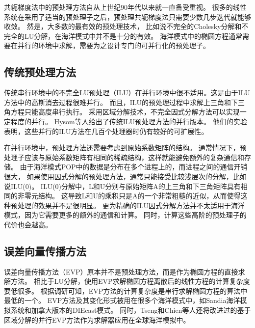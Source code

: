 共轭梯度法中的预处理方法自从上世纪90年代以来就一直备受重视。 
很多的线性系统在采用了适当的预处理子之后，预处理共轭梯度法只需要少数几步迭代就能够收敛。 
然是，大多数的最有效的预处理技术， 比如说不完全的Cholesky分解和不完全的LU分解，在海洋模式中并不是十分的有效。 
海洋模式中的椭圆方程通常需要在并行的环境中求解，需要为之设计专门的可并行化的预处理子。 



\subsection{传统预处理方法}
\label{related:classical}

传统串行环境中的不完全LU预处理（ILU）在并行环境中很不适用。这是由于ILU方法中的高斯消去过程很难并行。 
而且，ILU的预处理过程中求解上三角和下三角方程只能高度串行执行。
采用区域分解技术，不完全因式分解方法可以实现一定程度的并行。 
Hysom等人\cite{hysom2001scalable}给出了传统ILU预处理方法的并行版本。 
他们的实验表明，这些并行的ILU方法在几百个处理器时仍有较好的可扩展性。

在并行环境中，预处理方法还需要考虑到原始系数矩阵的结构。 
通常情况下，预处理子应该与原始系数矩阵有相同的稀疏结构，这样就能避免额外的复杂通信和存储。 
由于海洋模式POP中的数据是分布在多个进程上的，而进程之间的通信开销很大， 如果使用因式分解的预处理方法，通常只能接受比较浅层次的分解，比如说ILU(0)。 
ILU(0)分解中，L和U分别与原始矩阵A的上三角和下三角矩阵具有相同的非零元结构\cite{benzi2002preconditioning}。
这导致L和U的乘积只是A的一个非常粗糙的近似，从而使得这种预处理的效果并不是很明显。 
更为精确的ILU因式分解方法并不太适用于海洋模式，因为它需要更多的额外的通信和计算。 
同时，计算这些高阶的预处理子的代价也会越高。 

\subsection{误差向量传播方法}
\label{related:evp}


误差向量传播方法（EVP）原本并不是预处理方法，而是作为椭圆方程的直接求解方法。 
相比于LU分解，使用EVP求解椭圆方程离散后的线性方程的计算复杂度要低很多。 
根据调研可知，EVP方法的计算复杂度是串行求解椭圆方程的算法中最低的一个。
EVP方法及其变化形式被用在很多个海洋模式中，如Sandia海洋模拟系统\cite{dietrich1987ocean}和加拿大版本的DIEcast模式\cite{tseng2011parallel}。 
同时，Tseng和Chien等人还将改进过的基于区域分解的并行EVP方法作为求解器应用在全球海洋模拟中。

